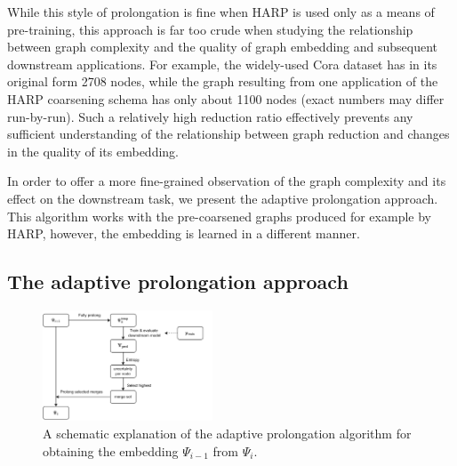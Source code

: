 While this style of prolongation is fine when HARP is used only as a means of pre-training, this approach is far too crude when studying the relationship between graph complexity and the quality of graph embedding and subsequent downstream applications. For example, the widely-used Cora dataset \cite{yang_revisiting_2016} has in its original form 2708 nodes, while the graph resulting from one application of the HARP coarsening schema has only about 1100 nodes (exact numbers may differ run-by-run). Such a relatively high reduction ratio effectively prevents any sufficient understanding of the relationship between graph reduction and changes in the quality of its embedding.

In order to offer a more fine-grained observation of the graph complexity and its effect on the downstream task, we present the adaptive prolongation approach. This algorithm works with the pre-coarsened graphs produced for example by HARP, however, the embedding is learned in a different manner.

\subsection{The adaptive prolongation approach}\label{sec:adaptive-prolongation}

\begin{figure}
  \centering
  \includegraphics[width=0.45\textwidth]{images/adaptive-prolongation/adaptive-prolongation.pdf}
    \caption{A schematic explanation of the adaptive prolongation algorithm for obtaining the embedding \( \Psi_{i - 1} \) from \( \Psi_i \).}
  \label{fig:adaptive-prolongation}
\end{figure}

